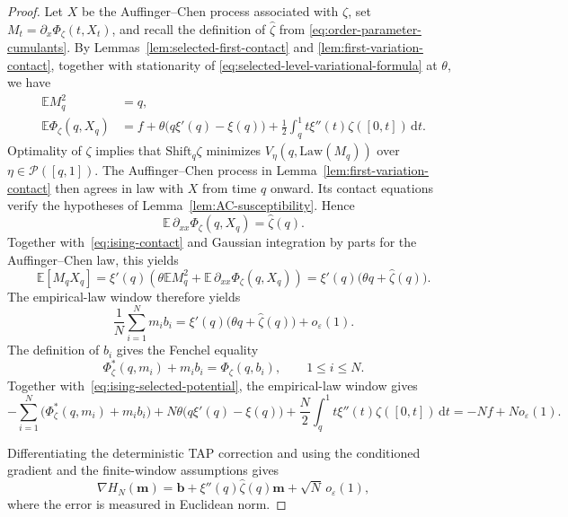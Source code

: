 \documentclass[a4paper,10pt,reqno]{amsart}
\numberwithin{equation}{section}
\newcommand{\ve}{\varepsilon}
\newcommand{\dE}{\mathbb{E}}%
\newcommand{\Law}{\mathrm{Law}}
\newcommand{\mc}{\mathcal}
\newcommand{\dd}{\mathrm{d}}
\newcommand{\bfm}{\mathbf{m}}
\newcommand{\bfb}{\mathbf{b}}
\newcommand{\Shift}{\mathrm{Shift}}%
\begin{document}
	\begin{proof}
		Let \(X\) be the Auffinger--Chen process associated with \(\zeta\), set
		\(M_t=\partial_x\Phi_\zeta(t,X_t)\), and recall the definition of
		\(\widehat\zeta\) from \eqref{eq:order-parameter-cumulants}.
		By Lemmas~\ref{lem:selected-first-contact} and
		\ref{lem:first-variation-contact}, together with stationarity of
		\eqref{eq:selected-level-variational-formula} at \(\theta\), we have
		\begin{align}
			\dE M_q^2&=q,
			\label{eq:ising-contact}\\
			\dE\Phi_\zeta(q,X_q)
			&=
			f+\theta\bigl(q\xi'(q)-\xi(q)\bigr)
			+\frac12\int_q^1t\xi''(t)\zeta([0,t])\,\dd t.
			\label{eq:ising-selected-potential}
		\end{align}
		Optimality of \(\zeta\) implies that \(\Shift_q\zeta\) minimizes
		\(V_\eta(q,\Law(M_q))\) over \(\eta\in\mc P([q,1])\). The
		Auffinger--Chen process in Lemma~\ref{lem:first-variation-contact}
		then agrees in law with \(X\) from time \(q\) onward. Its contact
		equations verify the hypotheses of
		Lemma~\ref{lem:AC-susceptibility}. Hence
		\[
		\dE\,\partial_{xx}\Phi_\zeta(q,X_q)=\widehat\zeta(q).
		\]
		Together with~\eqref{eq:ising-contact} and Gaussian integration by
		parts for the Auffinger--Chen law, this yields
		\[
		\dE[M_qX_q]
		=
		\xi'(q)\left(
		\theta\dE M_q^2
		+\dE\,\partial_{xx}\Phi_\zeta(q,X_q)
		\right)
		=
		\xi'(q)\bigl(\theta q+\widehat\zeta(q)\bigr).
		\]
		The empirical-law window therefore yields
		\begin{equation}\label{eq:ising-ward-inner}
			\frac1N\sum_{i=1}^N m_i b_i
			=
			\xi'(q)\bigl(\theta q+\widehat\zeta(q)\bigr)
			+o_\ve(1).
		\end{equation}
		The definition of \(b_i\) gives the Fenchel equality
		\begin{equation}\label{eq:ising-fenchel-identity}
			\Phi_\zeta^*(q,m_i)+m_i b_i=\Phi_\zeta(q,b_i),
			\qquad 1\le i\le N.
		\end{equation}
		Together with~\eqref{eq:ising-selected-potential}, the
		empirical-law window gives
		\begin{equation}\label{eq:ising-ward-energy}
			-\sum_{i=1}^N\bigl(\Phi_\zeta^*(q,m_i)+m_i b_i\bigr)
			+N\theta\bigl(q\xi'(q)-\xi(q)\bigr)
			+\frac N2\int_q^1t\xi''(t)\zeta([0,t])\,\dd t
			=-Nf+N o_\ve(1).
		\end{equation}
		
		Differentiating the deterministic TAP correction and using the conditioned
		gradient and the finite-window assumptions gives
		\[
		\nabla H_N(\bfm)
		=
		\bfb+\xi''(q)\widehat\zeta(q)\bfm
		+\sqrt N\,o_\ve(1),
		\]
		where the error is measured in Euclidean norm.
		

\end{proof}
\end{document}
